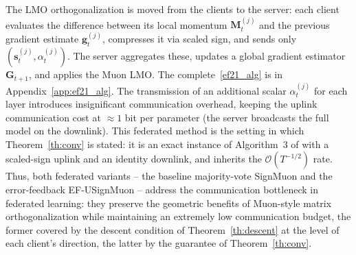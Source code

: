 \documentclass{article}
\begin{document}
The LMO orthogonalization is moved from the clients to the server: each client evaluates the difference between its local momentum $\mathbf{M}_t^{(j)}$ and the previous gradient estimate $\mathbf{g}_t^{(j)}$, compresses it via scaled sign, and sends only $(\mathbf{s}_t^{(j)}, \alpha_t^{(j)})$. The server aggregates these, updates a global gradient estimator $\mathbf{G}_{t+1}$, and applies the Muon LMO. The complete~\cref{ef21_alg} is in Appendix~\ref{app:ef21_alg}. The transmission of an additional scalar $\alpha_t^{(j)}$ for each layer introduces insignificant communication overhead, keeping the uplink communication cost at $\approx 1$ bit per parameter (the server broadcasts the full model on the downlink). This federated method is the setting in which Theorem~\ref{th:conv} is stated: it is an exact instance of Algorithm~3 of \citet{gruntkowska2025error} with a scaled-sign uplink and an identity downlink, and inherits the $\mathcal{O}(T^{-1/2})$ rate. Thus, both federated variants -- the baseline majority-vote SignMuon and the error-feedback EF-USignMuon -- address the communication bottleneck in federated learning: they preserve the geometric benefits of Muon-style matrix orthogonalization while maintaining an extremely low communication budget, the former covered by the descent condition of Theorem~\ref{th:descent} at the level of each client's direction, the latter by the guarantee of Theorem~\ref{th:conv}.
\end{document}
